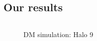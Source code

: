 \documentclass[xcolor=dvipsnames]{beamer}
\begin{document}
\subsection{Our results}

\begin{frame}[plain]

\begin{columns}[c]

\begin{column}{.5\textwidth}

\begin{figure}

\caption{\tiny DM simulation: Halo 9}


\end{figure}
\end{column}
\end{columns}
\end{frame}
\end{document}
